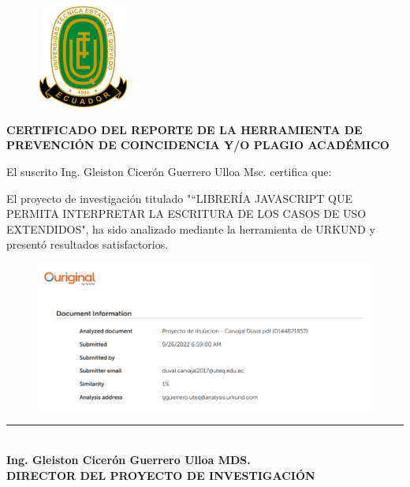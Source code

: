 \begin{center}
	
		\begin{figure}[htb]
		\begin{center}
			\includegraphics[width=3.04cm,height=3.39cm]{img/logoUTEQ.png}
		\end{center}
	\end{figure}
	
	
	{\titulodc \textbf{CERTIFICADO DEL REPORTE DE LA HERRAMIENTA DE PREVENCIÓN DE COINCIDENCIA Y/O PLAGIO ACADÉMICO}}
\end{center}

El suscrito Ing. Gleiston Cicerón Guerrero Ulloa Msc. certifica que:

\sloppy
El proyecto de investigación titulado "“LIBRERÍA JAVASCRIPT QUE PERMITA
INTERPRETAR LA ESCRITURA DE LOS CASOS DE USO EXTENDIDOS", ha sido analizado mediante la herramienta de URKUND y presentó resultados satisfactorios.

\begin{center}
	
	\begin{figure}[h!]
		\includegraphics[width=15cm]{img/urkund.png}
		\label{fig:urkund}
	\end{figure}
	
\end{center}

\begin{center}
	\vspace*{0.8in}
	\rule{8cm}{0.1mm} \\
	\textbf{Ing. Gleiston Cicerón Guerrero Ulloa MDS. \\
		DIRECTOR DEL PROYECTO DE INVESTIGACIÓN}
\end{center}